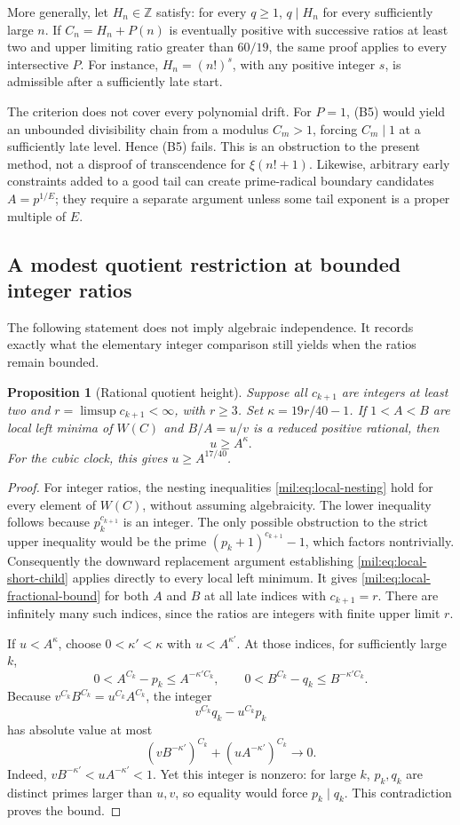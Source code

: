 \documentclass[11pt,a4paper]{article}
\newtheorem{proposition}[theorem]{Proposition}
\theoremstyle{definition}
\theoremstyle{remark}
\numberwithin{equation}{section}
\begin{document}
More generally, let $H_n\in\mathbb Z$ satisfy: for every $q\geq1$, $q\mid H_n$ for every sufficiently large $n$. If $C_n=H_n+P(n)$ is eventually positive with successive ratios at least two and upper limiting ratio greater than $60/19$, the same proof applies to every intersective $P$. For instance, $H_n=(n!)^s$, with any positive integer $s$, is admissible after a sufficiently late start.

The criterion does not cover every polynomial drift. For $P=1$, (B5) would yield an unbounded divisibility chain from a modulus $C_m>1$, forcing $C_m\mid1$ at a sufficiently late level. Hence (B5) fails. This is an obstruction to the present method, not a disproof of transcendence for $\xi(n!+1)$. Likewise, arbitrary early constraints added to a good tail can create prime-radical boundary candidates $A=p^{1/E}$; they require a separate argument unless some tail exponent is a proper multiple of $E$.

\subsection{A modest quotient restriction at bounded integer ratios}

The following statement does not imply algebraic independence. It records exactly what the elementary integer comparison still yields when the ratios remain bounded.

\begin{proposition}[Rational quotient height]
Suppose all $c_{k+1}$ are integers at least two and $r=\limsup c_{k+1}<\infty$, with $r\geq3$. Set $\kappa=19r/40-1$. If $1<A<B$ are local left minima of $W(C)$ and $B/A=u/v$ is a reduced positive rational, then
\[
 u\geq A^{\kappa}.
\]
For the cubic clock, this gives $u\geq A^{17/40}$.
\end{proposition}

\begin{proof}
For integer ratios, the nesting inequalities \eqref{mil:eq:local-nesting} hold for every element of $W(C)$, without assuming algebraicity. The lower inequality follows because $p_k^{c_{k+1}}$ is an integer. The only possible obstruction to the strict upper inequality would be the prime $(p_k+1)^{c_{k+1}}-1$, which factors nontrivially. Consequently the downward replacement argument establishing \eqref{mil:eq:local-short-child} applies directly to every local left minimum. It gives \eqref{mil:eq:local-fractional-bound} for both $A$ and $B$ at all late indices with $c_{k+1}=r$. There are infinitely many such indices, since the ratios are integers with finite upper limit $r$.

If $u<A^{\kappa}$, choose $0<\kappa'<\kappa$ with $u<A^{\kappa'}$. At those indices, for sufficiently large $k$,
\[
 0<A^{C_k}-p_k\leq A^{-\kappa'C_k},\qquad
 0<B^{C_k}-q_k\leq B^{-\kappa'C_k}.
\]
Because $v^{C_k}B^{C_k}=u^{C_k}A^{C_k}$, the integer
\[
 v^{C_k}q_k-u^{C_k}p_k
\]
has absolute value at most
\[
 (vB^{-\kappa'})^{C_k}+(uA^{-\kappa'})^{C_k}\longrightarrow0.
\]
Indeed, $vB^{-\kappa'}<uA^{-\kappa'}<1$. Yet this integer is nonzero: for large $k$, $p_k,q_k$ are distinct primes larger than $u,v$, so equality would force $p_k\mid q_k$. This contradiction proves the bound.
\end{proof}
\end{document}
